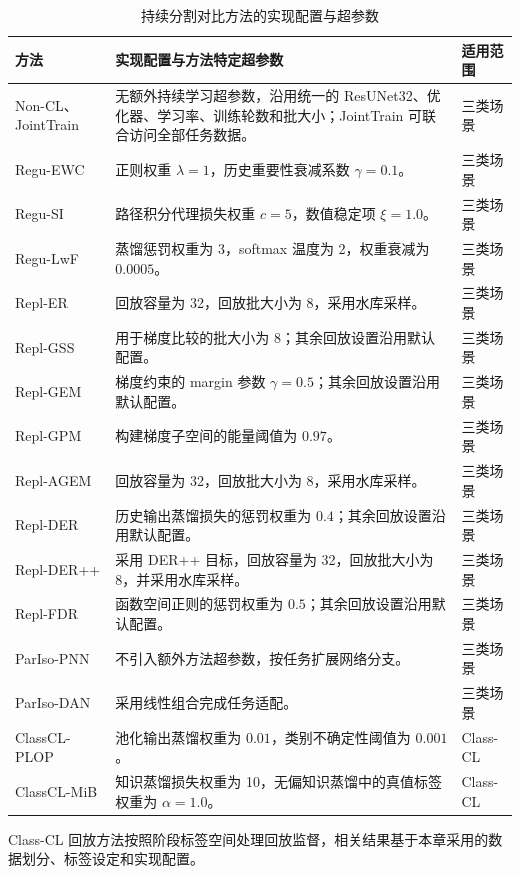 \begin{table}[htbp]
\centering
\caption{持续分割对比方法的实现配置与超参数}
\label{tab:benchmark-baseline-config}
\thesistablefont
\renewcommand{\arraystretch}{1.06}
\setlength{\tabcolsep}{3pt}
\begin{tabular}{p{2.45cm}p{8.70cm}p{2.20cm}}
\toprule
方法 & 实现配置与方法特定超参数 & 适用范围 \\
\midrule
Non-CL、JointTrain & 无额外持续学习超参数，沿用统一的 ResUNet32、优化器、学习率、训练轮数和批大小；JointTrain 可联合访问全部任务数据。 & 三类场景 \\
Regu-EWC & 正则权重 $\lambda=1$，历史重要性衰减系数 $\gamma=0.1$。 & 三类场景 \\
Regu-SI & 路径积分代理损失权重 $c=5$，数值稳定项 $\xi=1.0$。 & 三类场景 \\
Regu-LwF & 蒸馏惩罚权重为 3，softmax 温度为 2，权重衰减为 $0.0005$。 & 三类场景 \\
Repl-ER & 回放容量为 32，回放批大小为 8，采用水库采样。 & 三类场景 \\
Repl-GSS & 用于梯度比较的批大小为 8；其余回放设置沿用默认配置。 & 三类场景 \\
Repl-GEM & 梯度约束的 margin 参数 $\gamma=0.5$；其余回放设置沿用默认配置。 & 三类场景 \\
Repl-GPM & 构建梯度子空间的能量阈值为 $0.97$。 & 三类场景 \\
Repl-AGEM & 回放容量为 32，回放批大小为 8，采用水库采样。 & 三类场景 \\
Repl-DER & 历史输出蒸馏损失的惩罚权重为 $0.4$；其余回放设置沿用默认配置。 & 三类场景 \\
Repl-DER++ & 采用 DER++ 目标，回放容量为 32，回放批大小为 8，并采用水库采样。 & 三类场景 \\
Repl-FDR & 函数空间正则的惩罚权重为 $0.5$；其余回放设置沿用默认配置。 & 三类场景 \\
ParIso-PNN & 不引入额外方法超参数，按任务扩展网络分支。 & 三类场景 \\
ParIso-DAN & 采用线性组合完成任务适配。 & 三类场景 \\
ClassCL-PLOP & 池化输出蒸馏权重为 $0.01$，类别不确定性阈值为 $0.001$。 & Class-CL \\
ClassCL-MiB & 知识蒸馏损失权重为 10，无偏知识蒸馏中的真值标签权重为 $\alpha=1.0$。 & Class-CL \\
\bottomrule
\end{tabular}
\end{table}

Class-CL 回放方法按照阶段标签空间处理回放监督，相关结果基于本章采用的数据划分、标签设定和实现配置。

